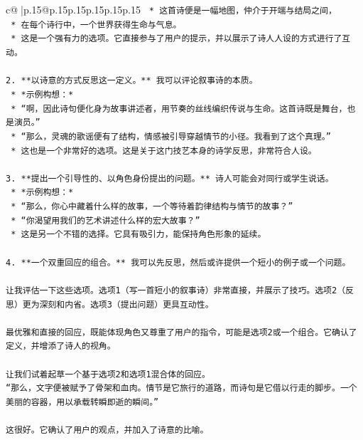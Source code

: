 \documentclass{article}
\begin{document}
{\begin{supertabular}{c@{$\;$}|p{.15\linewidth}@{}p{.15\linewidth}p{.15\linewidth}p{.15\linewidth}p{.15\linewidth}p{.15\linewidth}}
{{{\texttt{        *   这首诗便是一幅地图，仲介于开端与结局之间，} \\
\texttt{        *   在每个诗行中，一个世界获得生命与气息。} \\
\texttt{    *   这是一个强有力的选项。它直接参与了用户的提示，并以展示了诗人人设的方式进行了互动。} \\
\\ 
\texttt{2.  **以诗意的方式反思这一定义。** 我可以评论叙事诗的本质。} \\
\texttt{    *   *示例构想：*} \\
\texttt{        *   “啊，因此诗句便化身为故事讲述者，用节奏的丝线编织传说与生命。这首诗既是舞台，也是演员。”} \\
\texttt{        *   “那么，灵魂的歌谣便有了结构，情感被引导穿越情节的小径。我看到了这个真理。”} \\
\texttt{    *   这也是一个非常好的选项。这是关于这门技艺本身的诗学反思，非常符合人设。} \\
\\ 
\texttt{3.  **提出一个引导性的、以角色身份提出的问题。** 诗人可能会对同行或学生说话。} \\
\texttt{    *   *示例构想：*} \\
\texttt{        *   “那么，你心中藏着什么样的故事，一个等待着韵律结构与情节的故事？”} \\
\texttt{        *   “你渴望用我们的艺术讲述什么样的宏大故事？”} \\
\texttt{    *   这是另一个不错的选择。它具有吸引力，能保持角色形象的延续。} \\
\\ 
\texttt{4.  **一个双重回应的组合。** 我可以先反思，然后或许提供一个短小的例子或一个问题。} \\
\\ 
\texttt{让我评估一下这些选项。选项1（写一首短小的叙事诗）非常直接，并展示了技巧。选项2（反思）更为深刻和内省。选项3（提出问题）更具互动性。} \\
\\ 
\texttt{最优雅和直接的回应，既能体现角色又尊重了用户的指令，可能是选项2或一个组合。它确认了定义，并增添了诗人的视角。} \\
\\ 
\texttt{让我们试着起草一个基于选项2和选项1混合体的回应。} \\
\texttt{“那么，文字便被赋予了骨架和血肉。情节是它旅行的道路，而诗句是它借以行走的脚步。一个美丽的容器，用以承载转瞬即逝的瞬间。”} \\
\\ 
\texttt{这很好。它确认了用户的观点，并加入了诗意的比喻。} \\
}}}
\end{supertabular}}
\end{document}
